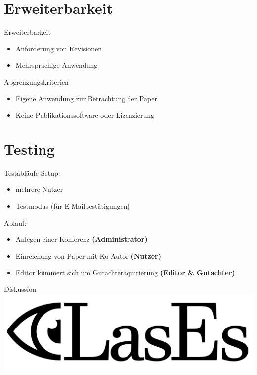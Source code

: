 \documentclass{beamer}
\begin{document}
    \section{Erweiterbarkeit}

    \begin{frame}{Erweiterbarkeit}
        \pause
        \begin{itemize}
            \item Anforderung von Revisionen
            \pause
            \item Mehrsprachige Anwendung
        \end{itemize}
    \end{frame}

    \begin{frame}{Abgrenzungskriterien}
        \pause
        \begin{itemize}
            \item Eigene Anwendung zur Betrachtung der Paper
            \pause
            \item Keine Publikationssoftware oder Lizenzierung
        \end{itemize}
    \end{frame}

    \section{Testing}
    \begin{frame}{Testabläufe}
        \pause
        Setup:
        \begin{itemize}
            \item mehrere Nutzer
            \item Testmodus (für E-Mailbestätigungen)
        \end{itemize}

        \pause

        Ablauf:
        \begin{itemize}
            \item Anlegen einer Konferenz \textbf{(Administrator)}
            \item Einreichung von Paper mit Ko-Autor \textbf{(Nutzer)}
            \item Editor kümmert sich um Gutachteraquirierung \textbf{(Editor \& Gutachter)}
        \end{itemize}
    \end{frame}

    \begin{frame}{Diskussion}
        \centering
        \includegraphics[width=0.7\linewidth]{../../docs/Pflichtenheft/graphics/LasEs-logo}
    \end{frame}
\end{document}
